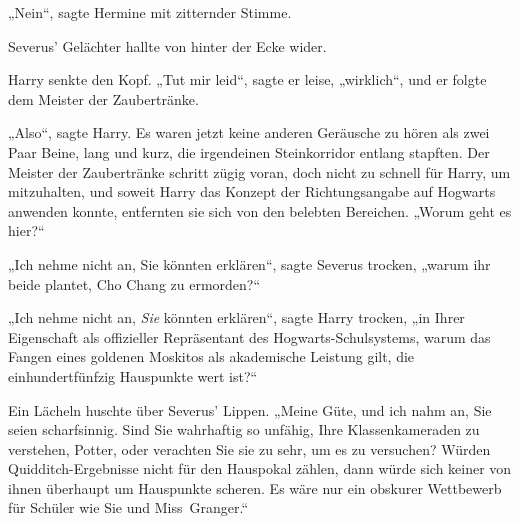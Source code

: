 „Nein“, sagte Hermine mit zitternder Stimme.

Severus’ Gelächter hallte von hinter der Ecke wider.

Harry senkte den Kopf.
„Tut mir leid“, sagte er leise, „wirklich“, und er folgte dem Meister der Zaubertränke.

\later

„Also“, sagte Harry. Es waren jetzt keine anderen Geräusche zu hören als zwei Paar Beine, lang und kurz, die irgendeinen Steinkorridor entlang stapften. Der Meister der Zaubertränke schritt zügig voran, doch nicht zu schnell für Harry, um mitzuhalten, und soweit Harry das Konzept der Richtungsangabe auf Hogwarts anwenden konnte, entfernten sie sich von den belebten Bereichen.
„Worum geht es hier?“

„Ich nehme nicht an, Sie könnten erklären“, sagte Severus trocken, „warum ihr beide plantet, Cho Chang zu ermorden?“

„Ich nehme nicht an, \emph{Sie} könnten erklären“, sagte Harry trocken, „in Ihrer Eigenschaft als offizieller Repräsentant des Hogwarts-Schulsystems, warum das Fangen eines goldenen Moskitos als akademische Leistung gilt, die einhundertfünfzig Hauspunkte wert ist?“

Ein Lächeln huschte über Severus’ Lippen.
„Meine Güte, und ich nahm an, Sie seien scharfsinnig. Sind Sie wahrhaftig so unfähig, Ihre Klassenkameraden zu verstehen, Potter, oder verachten Sie sie zu sehr, um es zu versuchen? Würden Quidditch-Ergebnisse nicht für den Hauspokal zählen, dann würde sich keiner von ihnen überhaupt um Hauspunkte scheren. Es wäre nur ein obskurer Wettbewerb für Schüler wie Sie und Miss~Granger.“

